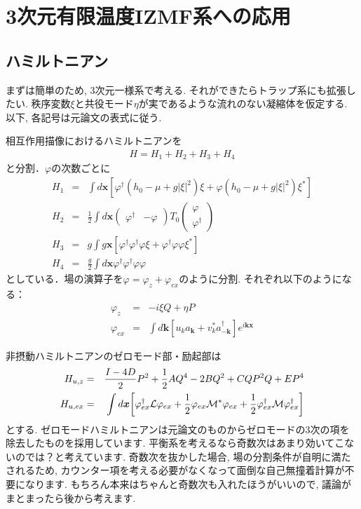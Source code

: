 \documentclass[10.5pt,a4paper]{jreport}
\begin{document}
\section{3次元有限温度IZMF系への応用}
\subsection{ハミルトニアン}
まずは簡単のため, 3次元一様系で考える. それができたらトラップ系にも拡張したい. 秩序変数$\xi$と共役モード$\eta$が実であるような流れのない凝縮体を仮定する. 以下, 各記号は元論文の表式に従う. 

相互作用描像におけるハミルトニアンを
\begin{eqnarray}
  H = H_1 + H_2 + H_3 + H_4
\end{eqnarray}
と分割．$\varphi$の次数ごとに
\begin{eqnarray}
  H_1 &=& \int d\bm{x} \left[ \varphi^\dagger(h_0 -\mu + g|\xi|^2)\xi + \varphi(h_0 - \mu + g|\xi|^2)\xi^* \right]\\
  H_2 &=& \frac{1}{2}\int d\bm{x}
  \begin{pmatrix}
    \varphi^\dagger & -\varphi
  \end{pmatrix}
  T_0
  \begin{pmatrix}
    \varphi\\
    \varphi^\dagger
  \end{pmatrix}
  \\
  H_3 &=& g\int g\bm{x} \left[ \varphi^\dagger\varphi^\dagger\varphi\xi + \varphi^\dagger\varphi\varphi\xi^* \right]\\
  H_4 &=& \frac{g}{2}\int d\bm{x} \varphi^\dagger\varphi^\dagger\varphi\varphi
\end{eqnarray}
としている．場の演算子を$\varphi = \varphi_{z} + \varphi_{ex}$のように分割. それぞれ以下のようになる：
\begin{eqnarray}
  \varphi_{z} &=& -i\xi Q + \eta P\label{Zeromode-expansion}\\
  \varphi_{ex} &=& \int d\bm{k} \left[ u_ka_{\bm{k}} + v_k^*a^\dagger_{-\bm{k}} \right]e^{i\bm{k}\bm{x}}\label{plane}
\end{eqnarray}

非摂動ハミルトニアンのゼロモード部・励起部は
\begin{eqnarray}
  H_{u, z} &=& \frac{I - 4D}{2}P^2 + \frac{1}{2}AQ^4 - 2BQ^2 + CQP^2Q + EP^4\\
  H_{u, ex} &=& \int d\bm{x} \qty[\varphi^\dagger_{ex}{\cal L}\varphi_{ex} + \frac{1}{2}\varphi_{ex}{\cal M}^*\varphi_{ex} + \frac{1}{2}\varphi^\dagger_{ex}{\cal M}\varphi^\dagger_{ex}]
\end{eqnarray}
とする. ゼロモードハミルトニアンは元論文のものからゼロモードの3次の項を除去したものを採用しています. 平衡系を考えるなら奇数次はあまり効いてこないのでは？と考えています. 奇数次を抜かした場合, 場の分割条件が自明に満たされるため, カウンター項を考える必要がなくなって面倒な自己無撞着計算が不要になります. もちろん本来はちゃんと奇数次も入れたほうがいいので, 議論がまとまったら後から考えます.
\end{document}
